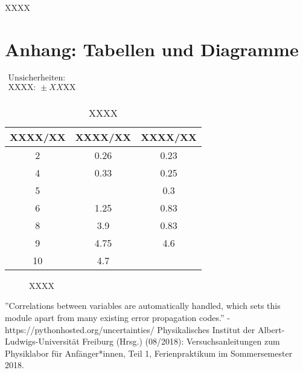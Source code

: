 \documentclass[11pt,a4paper]{article}
\begin{document}
XXXX

\pagebreak

\section{Anhang: Tabellen und Diagramme}

\begin{table}[h]
\centering
\caption{XXXX} \vspace{11pt}
$\begin{array}{l}
\textrm{Unsicherheiten:}\\
\textrm{XXXX: } \pm XX \textrm{XX}\\
\end{array}$
\begin{tabular}{ccc}
\toprule
\textrm{XXXX}/\textrm{XX} & \textrm{XXXX}/\textrm{XX} & \textrm{XXXX}/\textrm{XX} \\
\midrule 
2 & 0.26 & 0.23\\
\hline
4 & 0.33 & 0.25\\
\hline 
5 & & 0.3\\
\hline 
6 & 1.25 & 0.83\\
\hline 
8 & 3.9 & 0.83\\ 
\hline
9 & 4.75 & 4.6\\ 
\hline
10 & 4.7 &\\ 
\bottomrule
\end{tabular}
\label{Tab:X}
\end{table}

\begin{figure}[p]
\centering
{}
\renewcommand\thefigure{BX}
\caption[XXXX]{XXXX}
\label{Abb:X}
\end{figure}

\begin{thebibliography}{9}
''Correlations between variables are automatically handled, which sets this module apart from many existing error propagation codes.'' - https://pythonhosted.org/uncertainties/
 Physikalisches Institut der Albert-Ludwigs-Universität Freiburg (Hrsg.) (08/2018): Versuchsanleitungen zum Physiklabor für Anfänger*innen, Teil 1, Ferienpraktikum im Sommersemester 2018.
\end{thebibliography}
\end{document}
